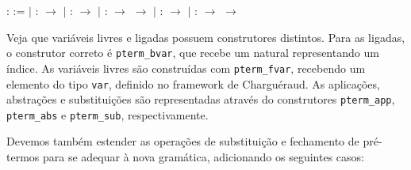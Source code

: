 \bigskip
\coqdocnoindent {}  :  :=\coqdoceol
\coqdocindent{1.00em} \ensuremath{|}  :
\ensuremath{\rightarrow} \coqdoceol \coqdocindent{1.00em}
\ensuremath{|}  : 
\ensuremath{\rightarrow} \coqdoceol \coqdocindent{1.00em}
\ensuremath{|}   :  \ensuremath{\rightarrow}
 \ensuremath{\rightarrow}
\coqdoceol
\coqdocindent{1.00em} \ensuremath{|}   :  \ensuremath{\rightarrow}
\coqdoceol
\coqdocindent{1.00em} \ensuremath{|}  :  \ensuremath{\rightarrow}
 \ensuremath{\rightarrow}
 \coqdoceol
\bigskip

Veja que variáveis livres e ligadas possuem construtores distintos. Para as
ligadas, o construtor correto é \texttt{pterm\_bvar}, que recebe um natural
representando um índice. As variáveis livres são construídas com
\texttt{pterm\_fvar}, recebendo um elemento do tipo \texttt{var}, definido no
framework de Charguéraud.
As aplicações, abstrações e substituições são representadas através do
construtores \texttt{pterm\_app}, \texttt{pterm\_abs} e \texttt{pterm\_sub},
respectivamente. 

Devemos também estender as operações de substituição e fechamento de pré-termos
para se adequar à nova gramática, adicionando os seguintes casos:

